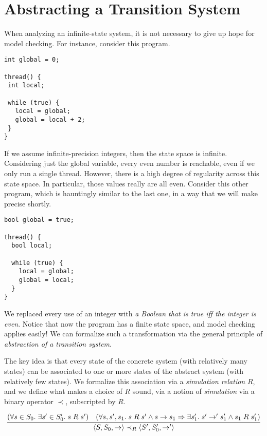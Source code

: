 \documentclass{amsbook}
\theoremstyle{definition}
\theoremstyle{remark}
\numberwithin{section}{chapter}
\numberwithin{equation}{chapter}
\begin{document}
\section{Abstracting a Transition System}

When analyzing an infinite-state system, it is not necessary to give up hope for model checking.
For instance, consider this program.
\begin{verbatim}
int global = 0;

thread() {
 int local;

 while (true) {
   local = global;
   global = local + 2;
 }
}
\end{verbatim}

If we assume infinite-precision integers, then the state space is infinite.
Considering just the global variable, every even number is reachable, even if we only run a single thread.
However, there is a high degree of regularity across this state space.
In particular, those values really are all even.
Consider this other program, which is hauntingly similar to the last one, in a way that we will make precise shortly.
\begin{verbatim}
bool global = true;

thread() {
  bool local;

  while (true) {
    local = global;
    global = local;
  }
}
\end{verbatim}

We replaced every use of an integer with \emph{a Boolean that is true iff the integer is even}.
Notice that now the program has a finite state space, and model checking applies easily!
We can formalize such a transformation via the general principle of \emph{abstraction of a transition system}.

\newcommand{\simulate}[0]{\prec}

The key idea is that every state of the concrete system (with relatively many states) can be associated to one or more states of the abstract system (with relatively few states).
We formalize this association via a \emph{simulation relation} $R$, and we define what makes a choice of $R$ sound, via a notion of \emph{simulation} via a binary operator $\simulate$, subscripted by $R$.

$$\infer{\angled{S, S_0, \to} \simulate_R \angled{S', S'_0, \to'}}{
  (\forall s \in S_0. \; \exists s' \in S'_0. \; s \; R \; s')
  & (\forall s, s', s_1. \; s \; R \; s' \land s \to s_1 \Rightarrow \exists s'_1. \; s' \to' s'_1 \land s_1 \; R \; s'_1)
}$$
\end{document}
